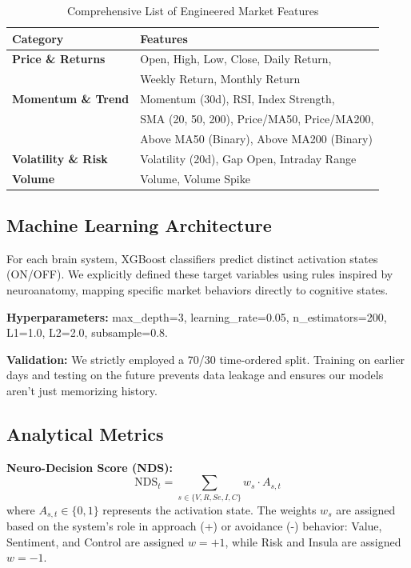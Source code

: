 \documentclass[conference]{IEEEtran}
\begin{document}
\begin{table}[htbp]
\centering
\caption{Comprehensive List of Engineered Market Features}
\label{tab:feature_list}
\begin{tabular}{@{}ll@{}}
\toprule
\textbf{Category} & \textbf{Features} \\
\midrule
\textbf{Price \& Returns} & Open, High, Low, Close, Daily Return, \\
& Weekly Return, Monthly Return \\
\midrule
\textbf{Momentum \& Trend} & Momentum (30d), RSI, Index Strength, \\
& SMA (20, 50, 200), Price/MA50, Price/MA200, \\
& Above MA50 (Binary), Above MA200 (Binary) \\
\midrule
\textbf{Volatility \& Risk} & Volatility (20d), Gap Open, Intraday Range \\
\midrule
\textbf{Volume} & Volume, Volume Spike \\
\bottomrule
\end{tabular}
\end{table}


\subsection{Machine Learning Architecture}

For each brain system, XGBoost classifiers predict distinct activation states (ON/OFF). We explicitly defined these target variables using rules inspired by neuroanatomy, mapping specific market behaviors directly to cognitive states.

\textbf{Hyperparameters:} max\_depth=3, learning\_rate=0.05, n\_estimators=200, L1=1.0, L2=2.0, subsample=0.8.

\textbf{Validation:} We strictly employed a 70/30 time-ordered split. Training on earlier days and testing on the future prevents data leakage and ensures our models aren't just memorizing history.

\subsection{Analytical Metrics}

\textbf{Neuro-Decision Score (NDS):}
\begin{equation}
\text{NDS}_t = \sum_{s \in \{V,R,Se,I,C\}} w_s \cdot A_{s,t}
\end{equation}
where $A_{s,t} \in \{0,1\}$ represents the activation state. The weights $w_s$ are assigned based on the system's role in approach (+) or avoidance (-) behavior: Value, Sentiment, and Control are assigned $w=+1$, while Risk and Insula are assigned $w=-1$.
\end{document}
